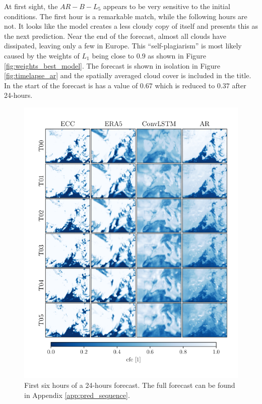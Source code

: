 At first sight, the $AR-B-L_5$ appears to be very sensitive to the initial conditions. The first hour is a remarkable match, while the following hours are not. It looks like the model creates a less cloudy copy of itself and presents this as the next prediction. Near the end of the forecast, almost all clouds have dissipated, leaving only a few in Europe. This ``self-plagiarism'' is most likely caused by the weights of $L_1$ being close to $0.9$ as shown in Figure \ref{fig:weights_best_model}. The forecast is shown in isolation in Figure \ref{fig:timelapse_ar} and the spatially averaged cloud cover is included in the title. In the start of the forecast is has a value of $0.67$ which is reduced to $0.37$ after 24-hours.
\begin{figure}[ht]
    \centering
    \includegraphics[sale=0.1]{python_figs/comparing_seq_part_1_of4_jan2.png}
    \caption{First six hours of a 24-hours forecast. The full forecast can be found in Appendix \ref{app:pred_sequence}.}
    \label{fig:pred_sequence}
\end{figure}

